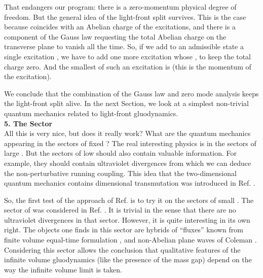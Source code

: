 \documentclass[a4paper,12pt]{article}
\begin{document}
That endangers our program: there is a zero-momentum
physical degree of freedom. But the general idea of 
the light-front split survives. This is the case 
because \myHighlight{$\sigma$}\coordHE{} coincides with an Abelian charge 
of the excitations, and there is 
a component of the Gauss law requesting the total Abelian charge on the 
transverse plane to vanish all the time. So, if we add 
to an admissible state a single excitation \coordHE{}, 
we have to add one more excitation whose \coordHE{}, 
to keep the total charge zero. And the smallest 
\coordHE{} of such an excitation is 
\coordHE{} (this is the momentum of the \coordHE{} excitation).

We conclude that the combination of the Gauss law and 
zero mode analysis keeps the light-front split alive. 
In the next Section, we look at a simplest non-trivial 
quantum mechanics related to light-front \coordHE{} gluodynamics.\\

{\bf 5. The \coordHE{} Sector }\\

All this is very nice, but does it really work? 
What are the quantum mechanics appearing in the sectors 
of fixed \coordHE{}? The real interesting physics is in the 
sectors of large \coordHE{}. But the sectors of low \coordHE{} 
should also contain valuable information. For example, 
they should contain ultraviolet divergences 
from which we can deduce the non-perturbative 
running coupling. This idea that the two-dimensional
quantum mechanics contains dimensional transmutation
was introduced in Ref. \cite{Thorn}.

So, the first test of the approach of Ref. \cite{KMPV} is to try it 
on the sectors of small 
\coordHE{}. The sector of 
\coordHE{}  was considered in Ref. \cite{KMPV}. 
It is trivial in the sense that there are no 
ultraviolet divergences
in that sector. However, it is quite interesting 
in its own right. The objects one finds in this sector are hybrids of
``fluxes'' known from finite volume equal-time formulation \cite{tHooft},
and non-Abelian plane waves of Coleman \cite{Col}. Considering this
sector allows the 
conclusion that qualitative features of the
infinite volume gluodynamics (like the presence of the mass gap) 
depend on the way the infinite volume limit is taken.
\end{document}
